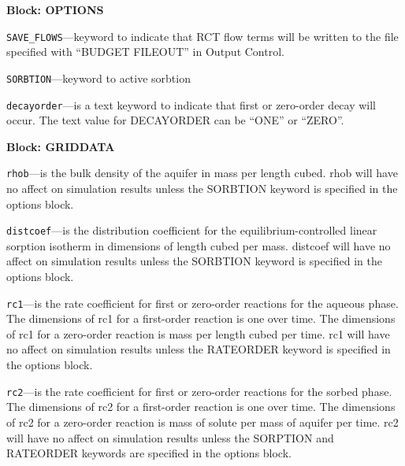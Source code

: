 
\item \textbf{Block: OPTIONS}

\begin{description}
\item \texttt{SAVE\_FLOWS}---keyword to indicate that RCT flow terms will be written to the file specified with ``BUDGET FILEOUT'' in Output Control.

\item \texttt{SORBTION}---keyword to active sorbtion

\item \texttt{decayorder}---is a text keyword to indicate that first or zero-order decay will occur.  The text value for DECAYORDER can be ``ONE'' or ``ZERO''.

\end{description}
\item \textbf{Block: GRIDDATA}

\begin{description}
\item \texttt{rhob}---is the bulk density of the aquifer in mass per length cubed.  rhob will have no affect on simulation results unless the SORBTION keyword is specified in the options block.

\item \texttt{distcoef}---is the distribution coefficient for the equilibrium-controlled linear sorption isotherm in dimensions of length cubed per mass.  distcoef will have no affect on simulation results unless the SORBTION keyword is specified in the options block.

\item \texttt{rc1}---is the rate coefficient for first or zero-order reactions for the aqueous phase.  The dimensions of rc1 for a first-order reaction is one over time.  The dimensions of rc1 for a zero-order reaction is mass per length cubed per time.  rc1 will have no affect on simulation results unless the RATEORDER keyword is specified in the options block.

\item \texttt{rc2}---is the rate coefficient for first or zero-order reactions for the sorbed phase.  The dimensions of rc2 for a first-order reaction is one over time.  The dimensions of rc2 for a zero-order reaction is mass of solute per mass of aquifer per time.  rc2 will have no affect on simulation results unless the SORPTION and RATEORDER keywords are specified in the options block.

\end{description}

